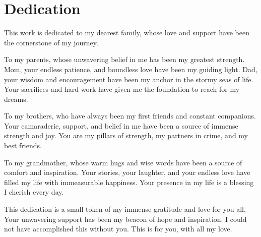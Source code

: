 \chapter*{Dedication}

This work is dedicated to my dearest family, whose love and support have been the cornerstone of my journey. 
\vspace{10pt}

To my parents, whose unwavering belief in me has been my greatest strength. Mom, your endless patience, and boundless love have been my guiding light. Dad, your wisdom and encouragement have been my anchor in the stormy seas of life. Your sacrifices and hard work have given me the foundation to reach for my dreams.
\vspace{10pt}

To my brothers, who have always been my first friends and constant companions. Your camaraderie, support, and belief in me have been a source of immense strength and joy. You are my pillars of strength, my partners in crime, and my best friends.
\vspace{10pt}

To my grandmother, whose warm hugs and wise words have been a source of comfort and inspiration. Your stories, your laughter, and your endless love have filled my life with immeasurable happiness. Your presence in my life is a blessing I cherish every day.
\vspace{10pt}

This dedication is a small token of my immense gratitude and love for you all. Your unwavering support has been my beacon of hope and inspiration. I could not have accomplished this without you. This is for you, with all my love.
